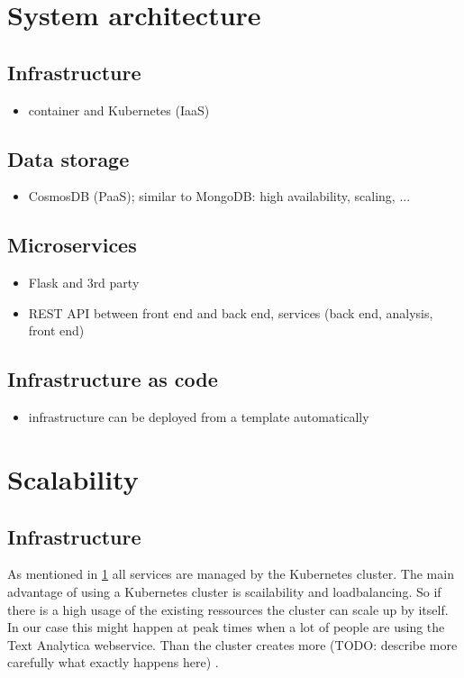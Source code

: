\documentclass[conference]{IEEEtran}
\begin{document}
\section{System architecture}
\label{sec:system-architecture}
\subsection{Infrastructure}
\begin{itemize}
	\item container and Kubernetes (IaaS)
\end{itemize}

\subsection{Data storage}
\begin{itemize}
	\item CosmosDB (PaaS); similar to MongoDB: high availability, scaling, ...
\end{itemize}

\subsection{Microservices}
\begin{itemize}
	\item Flask and 3rd party
	\item REST API between front end and back end,  services (back end, analysis, front end)
\end{itemize}

\subsection{Infrastructure as code}
\begin{itemize}
	\item infrastructure can be deployed from a template automatically
\end{itemize}

\section{Scalability}
\label{sec:scalability}
\subsection{Infrastructure}
As mentioned in \cref{sec:system-architecture} all services are managed by the Kubernetes cluster.
The main advantage of using a Kubernetes cluster is scailability and loadbalancing. So if there is a high usage of the
existing ressources the cluster can scale up by itself. In our case this might happen at peak times when a lot of people
are using the Text Analytica webservice. Than the cluster creates more (TODO:  describe more carefully what exactly happens here)
\cite{MicrosoftAzureKubernetesService}.
\end{document}
